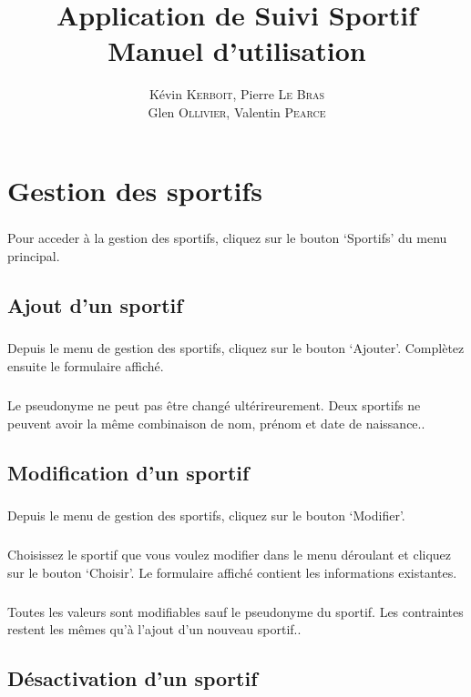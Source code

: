 \documentclass[french,12pt,a4paper,openany]{book}
\author{Kévin \textsc{Kerboit}, Pierre \textsc{Le Bras}\\Glen \textsc{Ollivier}, Valentin \textsc{Pearce}}
\title{Application de Suivi Sportif \\ Manuel d'utilisation}
\date{}
\begin{document}
	\maketitle
	\tableofcontents
	\chapter{Gestion des sportifs}
		\paragraph{}{Pour acceder à la gestion des sportifs, cliquez sur le bouton `Sportifs' du menu principal.}
		\section{Ajout d'un sportif}
			\paragraph{}{Depuis le menu de gestion des sportifs, cliquez sur le bouton `Ajouter'. Complètez ensuite le formulaire affiché.}
			\paragraph{}{Le pseudonyme ne peut pas être changé ultérireurement. Deux sportifs ne peuvent avoir la même combinaison de nom, prénom et date de naissance.}.
		\section{Modification d'un sportif}
			\paragraph{}{Depuis le menu de gestion des sportifs, cliquez sur le bouton `Modifier'.}
			\paragraph{}{Choisissez le sportif que vous voulez modifier dans le menu déroulant et cliquez sur le bouton `Choisir'. Le formulaire affiché contient les informations existantes.}
			\paragraph{}{Toutes les valeurs sont modifiables sauf le pseudonyme du sportif. Les contraintes restent les mêmes qu'à l'ajout d'un nouveau sportif.}.
		\section{Désactivation d'un sportif}
\end{document}
